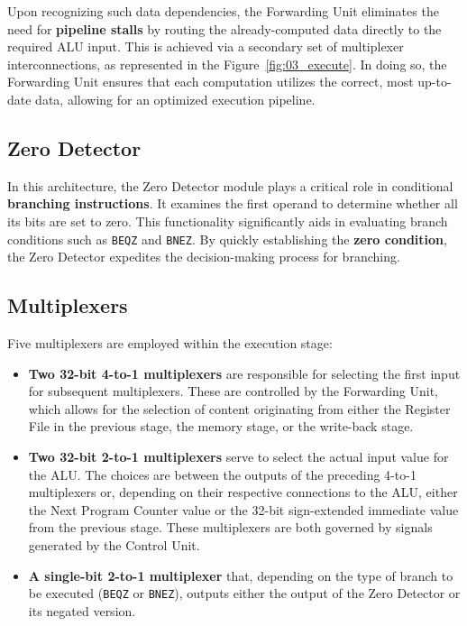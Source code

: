 Upon recognizing such data dependencies, the Forwarding Unit eliminates the need for \textbf{pipeline stalls} by routing the already-computed data directly to the required ALU input. This is achieved via a secondary set of multiplexer interconnections, as represented in the Figure~\ref{fig:03_execute}. In doing so, the Forwarding Unit ensures that each computation utilizes the correct, most up-to-date data, allowing for an optimized execution pipeline.

\subsection{Zero Detector}
In this architecture, the Zero Detector module plays a critical role in conditional \textbf{branching instructions}. It examines the first operand to determine whether all its bits are set to zero. This functionality significantly aids in evaluating branch conditions such as \texttt{BEQZ} and \texttt{BNEZ}. By quickly establishing the \textbf{zero condition}, the Zero Detector expedites the decision-making process for branching.

\subsection{Multiplexers}
Five multiplexers are employed within the execution stage:
\begin{itemize}
    \item \textbf{Two 32-bit 4-to-1 multiplexers} are responsible for selecting the first input for subsequent multiplexers. These are controlled by the Forwarding Unit, which allows for the selection of content originating from either the Register File in the previous stage, the memory stage, or the write-back stage.
    \item \textbf{Two 32-bit 2-to-1 multiplexers} serve to select the actual input value for the ALU. The choices are between the outputs of the preceding 4-to-1 multiplexers or, depending on their respective connections to the ALU, either the Next Program Counter value or the 32-bit sign-extended immediate value from the previous stage. These multiplexers are both governed by signals generated by the Control Unit.
    \item \textbf{A single-bit 2-to-1 multiplexer} that, depending on the type of branch to be executed (\texttt{BEQZ} or \texttt{BNEZ}), outputs either the output of the Zero Detector or its negated version.
\end{itemize}

